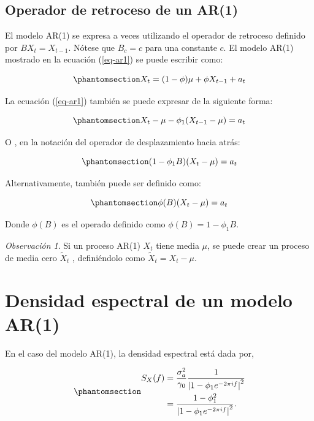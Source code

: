 \documentclass[
  us-letterpaper,
]{scrreprt}
\theoremstyle{plain}
\theoremstyle{definition}
\theoremstyle{definition}
\theoremstyle{remark}
\newtheorem*{remark}{Observación}
\begin{document}
\subsection{Operador de retroceso de un
AR(1)}\label{operador-de-retroceso-de-un-ar1}

El modelo AR(1) se expresa a veces utilizando el operador de retroceso
definido por \(BX_t  = X_{t−1}.\) Nótese que \(B_c = c\) para una
constante \(c\). El modelo AR(1) mostrado en la ecuación (\ref{eq-ar1})
se puede escribir como:

\begin{equation}\phantomsection\label{eq-op}{
X_t= (1-\phi) \mu + \phi X_{t-1} + a_t
}\end{equation}

La ecuación (\ref{eq-ar1}) también se puede expresar de la siguiente
forma:

\begin{equation}\phantomsection\label{eq-op1}{
X_t-\mu - \phi_1(X_{t-1} - \mu) = a_t
}\end{equation}

O , en la notación del operador de desplazamiento hacia atrás:

\begin{equation}\phantomsection\label{eq-op2}{
(1-\phi_1 B)(X_t-\mu) = a_t
}\end{equation}

Alternativamente, también puede ser definido como:

\begin{equation}\phantomsection\label{eq-op3}{
\phi(B)(X_t - \mu) = a_t
}\end{equation}

Donde \(\phi (B)\) es el operado definido como
\(\phi (B) = 1- \phi_1 B.\)

\begin{remark}
Si un proceso AR(1) \(X_t\) tiene media \(\mu\), se puede crear un
proceso de media cero \(\tilde{X}_t\) , definiéndolo como
\(\tilde{X}_t = X_t - \mu.\)
\end{remark}

\section{Densidad espectral de un modelo
AR(1)}\label{densidad-espectral-de-un-modelo-ar1}

En el caso del modelo AR(1), la densidad espectral está dada por,

\begin{equation}\phantomsection\label{eq-dear1}{
\begin{split}
  S_X(f) &= \frac{\sigma_a^2}{\gamma_0} \frac{1}{\left| 1 - \phi_1 e^{-2 \pi i f} \right|^2} \\ 
        &= \frac{1 - \phi_1^2}{\left| 1 - \phi_1 e^{-2 \pi i f} \right|^2}.
\end{split}
}\end{equation}
\end{document}
